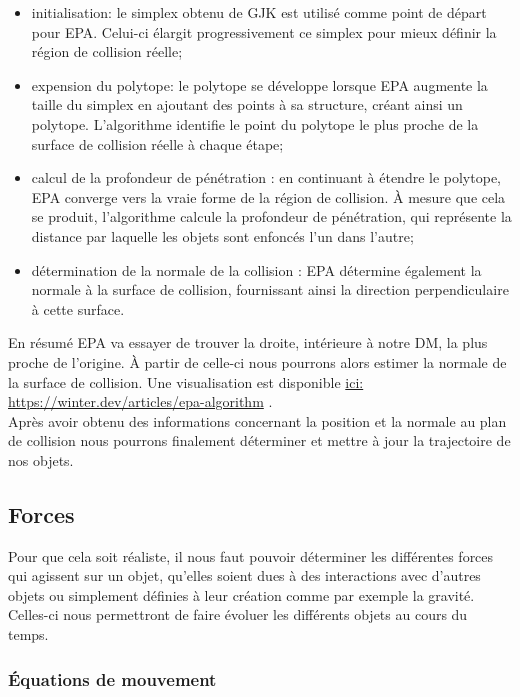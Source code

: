 \begin{itemize}[label=-]
	\item initialisation: le simplex obtenu de GJK est utilisé comme point de départ pour EPA. Celui-ci élargit progressivement ce simplex pour mieux définir la région de collision réelle;
	\item expension du polytope: le polytope se développe lorsque EPA augmente la taille du simplex en ajoutant des points à sa structure, créant ainsi un polytope. L'algorithme identifie le point du polytope le plus proche de la surface de collision réelle à chaque étape;
	\item calcul de la profondeur de pénétration : en continuant à étendre le polytope, EPA converge vers la vraie forme de la région de collision. À mesure que cela se produit, l'algorithme calcule la profondeur de pénétration, qui représente la distance par laquelle les objets sont enfoncés l'un dans l'autre;
	\item détermination de la normale de la collision : EPA détermine également la normale à la surface de collision, fournissant ainsi la direction perpendiculaire à cette surface.
	
\end{itemize}

En résumé EPA va essayer de trouver la droite, intérieure à notre DM, la plus proche de l'origine. À partir de celle-ci nous pourrons alors estimer la normale de la surface de collision. Une visualisation est disponible \href{https://winter.dev/articles/epa-algorithm}{ici: https://winter.dev/articles/epa-algorithm} \citep{demoEPA}.\\

Après avoir obtenu des informations concernant la position et la normale au plan de collision nous pourrons finalement déterminer et mettre à jour la trajectoire de nos objets. 
\pagebreak

\subsection{Forces}
Pour que cela soit réaliste, il nous faut pouvoir déterminer les différentes forces qui agissent sur un objet, qu'elles soient dues à des interactions avec d'autres objets ou simplement définies à leur création comme par exemple la gravité. Celles-ci nous permettront de faire évoluer les différents objets au cours du temps.

\subsubsection{Équations de mouvement}

